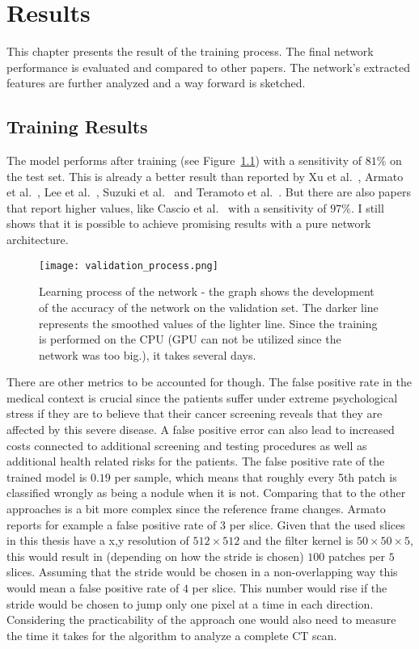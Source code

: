 \documentclass[main.tex]{subfiles}
\begin{document}
\chapter{Results}\label{chap:results}
This chapter presents the result of the training process. The final network performance is evaluated and compared to other papers. The network's extracted features are further analyzed and a way forward is sketched.

\section{Training Results}
The model performs after training (see Figure~\ref{fig:validation}) with a sensitivity of $81\%$ on the test set. This is already a better result than reported by Xu et al.~\cite{xu1997development}, Armato et al.~\cite{armato1999computerized}, Lee et al.~\cite{lee2001automated}, Suzuki et al.~\cite{suzuki2003massive} and Teramoto et al.~\cite{teramoto2013fast}. But there are also papers that report higher values, like Cascio et al.~\cite{cascio2012automatic} with a sensitivity of $97\%$. I still shows that it is possible to achieve promising results with a pure network architecture.

\begin{figure}
\begin{center}
\texttt{[image: validation\_process.png]}
\end{center}
\caption{Learning process of the network - the graph shows the development of the accuracy of the network on the validation set. The darker line represents the smoothed values of the lighter line. Since the training is performed on the CPU (GPU can not be utilized since the network was too big.), it takes several days.}
\label{fig:validation}
\end{figure}

There are other metrics to be accounted for though. The false positive rate in the medical context is crucial since the patients suffer under extreme psychological stress if they are to believe that their cancer screening reveals that they are affected by this severe disease. A false positive error can also lead to increased costs connected to additional screening and testing procedures as well as additional health related risks for the patients. The false positive rate of the trained model is $0.19$ per sample, which means that roughly every 5th patch is classified wrongly as being a nodule when it is not. Comparing that to the other approaches is a bit more complex since the reference frame changes. Armato~\cite{armato1999computerized} reports for example a false positive rate of 3 per slice. Given that the used slices in this thesis have a x,y resolution of $512 \times 512$ and the filter kernel is $50 \times 50 \times 5$, this would result in (depending on how the stride is chosen) $100$ patches per $5$ slices. Assuming that the stride would be chosen in a non-overlapping way this would mean a false positive rate of $4$ per slice. This number would rise if the stride would be chosen to jump only one pixel at a time in each direction.  
Considering the practicability of the approach one would also need to measure the time it takes for the algorithm to analyze a complete CT scan.
\end{document}
